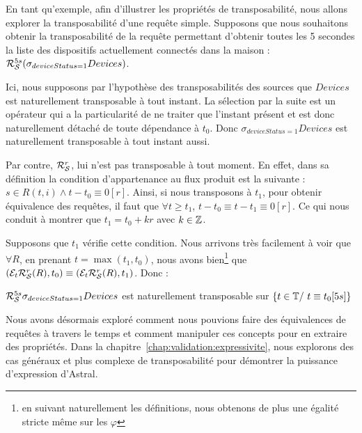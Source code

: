 \begin{example}\label{ex:transposabilite}
	En tant qu'exemple, afin d'illustrer les propriétés de transposabilité, nous allons explorer la transposabilité d'une requête simple. Supposons que nous souhaitons obtenir la transposabilité de la requête permettant d'obtenir toutes les 5 secondes la liste des dispositifs actuellement connectés dans la maison : $\mathcal{R}_{\mathcal S}^{5s} (\sigma_{deviceStatus=1} Devices)$. 
	
	Ici, nous supposons par l'hypothèse des transposabilités des sources que $Devices$ est naturellement transposable à tout instant. La sélection par la suite est un opérateur qui a la particularité de ne traiter que l'instant présent et est donc naturellement détaché de toute dépendance à $t_0$. Donc $\sigma_{deviceStatus=1} Devices$ est naturellement transposable à tout instant aussi.
	
	Par contre, $\mathcal{R}_{\mathcal S}^{r}$, lui n'est pas transposable à tout moment. En effet, dans sa définition la condition d'appartenance au flux produit est la suivante : $s \in R(t,i)\wedge t-t_0 \equiv 0[r]$. Ainsi, si nous transposons à $t_1$, pour obtenir équivalence des requêtes, il faut que $\forall t \geq t_1$, $t-t_0\equiv t-t_1\equiv 0[r]$.  Ce qui nous conduit à montrer que $t_1 = t_0 +kr$ avec $k\in \mathbb{Z}$. 
	
	Supposons que $t_1$ vérifie cette condition. Nous arrivons très facilement à voir que $\forall R$, en prenant $t=\max(t_1,t_0)$, nous avons bien\footnote{en suivant naturellement les définitions, nous obtenons de plus une égalité stricte même sur les $\varphi$} que $(\mathcal{E}_{t}\mathcal{R}_{\mathcal S}^{r}(R),t_0) \equiv (\mathcal{E}_{t}\mathcal{R}_{\mathcal S}^{r}(R),t_1)$. Donc :
	\begin{center}$\mathcal{R}_{\mathcal S}^{5s}\sigma_{deviceStatus=1} Devices$ est naturellement transposable sur $\{t\in \mathbb{T} /\ t\equiv t_0 [5s]\}$\end{center}
\end{example}

Nous avons désormais exploré comment nous pouvions faire des équivalences de requêtes à travers le temps et comment manipuler ces concepts pour en extraire des propriétés. Dans la chapitre~\ref{chap:validation:expressivite}, nous explorons des cas généraux et plus complexe de transposabilité pour démontrer la puissance d'expression d'Astral.
